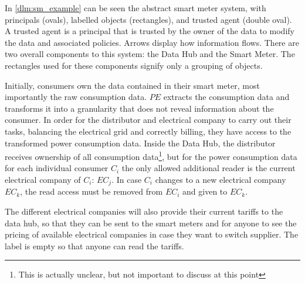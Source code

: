 In \cref{dlm:sm_example} can be seen the abstract smart meter system, with principals (ovals), labelled objects (rectangles), and trusted agent (double oval).
A trusted agent is a principal that is trusted by the owner of the data to modify the data and associated policies.
Arrows display how information flows.
There are two overall components to this system: the Data Hub and the Smart Meter.
The rectangles used for these components signify only a grouping of objects.

Initially, consumers own the data contained in their smart meter, most importantly the raw consumption data.
$PE$ extracts the consumption data and transforms it into a granularity that does not reveal information about the consumer.
In order for the distributor and electrical company to carry out their tasks, balancing the electrical grid and correctly billing, they have access to the transformed power consumption data.
Inside the Data Hub, the distributor receives ownership of all consumption data\footnote{This is actually unclear, but not important to discuss at this point}, but for the power consumption data for each individual consumer $C_i$ the only allowed additional reader is the current electrical company of $C_i$: $EC_j$.
In case $C_i$ changes to a new electrical company $EC_k$, the read access must be removed from $EC_i$ and given to $EC_k$.

The different electrical companies will also provide their current tariffs to the data hub, so that they can be sent to the smart meters and for anyone to see the pricing of available electrical companies in case they want to switch supplier.
The label is empty so that anyone can read the tariffs.
